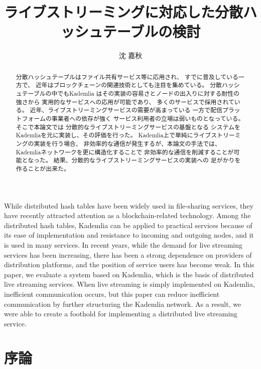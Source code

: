 \documentclass[sotsuron]{jcsie}
\title{ライブストリーミングに対応した分散ハッシュテーブルの検討}
\author{沈 嘉秋}
\begin{document}
\maketitle
\emaketitle
{}
\begin{abstract}    
	分散ハッシュテーブルはファイル共有サービス等に応用され、
	すでに普及している一方で、
	近年はブロックチェーンの関連技術としても注目を集めている。
	分散ハッシュテーブルの中でもKademlia
	はその実装の容易さとノードの出入りに対する耐性の強さから
	実用的なサービスへの応用が可能であり、
	多くのサービスで採用されている。
	近年、ライブストリーミングサービスの需要が高まっている
	一方で配信プラットフォームの事業者への依存が強く
	サービス利用者の立場は弱いものとなっている。
	そこで本論文では
	分散的なライブストリーミングサービスの基盤となる
	システムをKademliaを元に実装し、その評価を行った。
	Kademlia上で単純にライブストリーミングの実装を行う場合、
	非効率的な通信が発生するが、本論文の手法では、
	Kademliaネットワークを更に構造化することで
	非効率的な通信を削減することが可能となった。
	結果、分散的なライブストリーミングサービスの実装への
	足がかりを作ることが出来た。
\end{abstract}
\begin{eabstract}
	While distributed hash tables have been widely used in file-sharing services,
	they have recently attracted attention as a blockchain-related technology. 
	Among the distributed hash tables, 
	Kademlia can be applied to practical services because of 
	its ease of implementation and resistance to incoming and outgoing nodes, 
	and it is used in many services. 
	In recent years, while the demand for live streaming services has been 
	increasing, there has been a strong dependence on providers of distribution 
	platforms, and the position of service users has become weak. 
	In this paper, we evaluate a system based on Kademlia, 
	which is the basis of distributed live streaming services. 
	When live streaming is simply implemented on Kademlia, 
	inefficient communication occurs, but this paper can reduce inefficient 
	communication by further structuring the Kademlia network. 
	As a result, we were able to create a foothold for implementing a 
	distributed live streaming service.
\end{eabstract}
\setcounter{tocdepth}{2}
\tableofcontents
{}


\chapter{序論}
\end{document}
